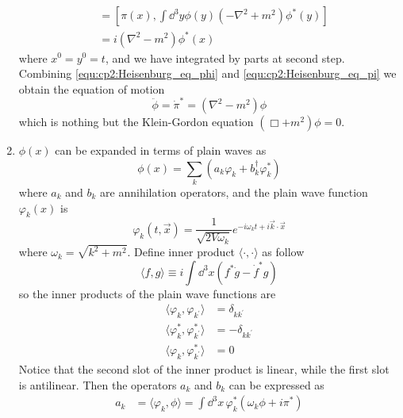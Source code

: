 \begin{enumerate}[label = {(\alph*)}]
\begin{align}
        & = \left[\pi(x), \int \dd^3y \phi(y)(-\nabla^2 + m^2)\phi^\ast(y)\right]\nonumber\\
        & = i(\nabla^2 - m^2) \phi^\ast(x)
    \end{align}
    where $x^0 = y^0 = t$, and we have integrated by parts at second step. Combining \eqref{equ:cp2:Heisenburg_eq_phi} 
    and \eqref{equ:cp2:Heisenburg_eq_pi} we obtain the equation of motion
    \begin{equation}\label{equ:cp2:csf_equation_of_motion}
        \ddot{\phi} = \dot{\pi}^\ast = (\nabla^2 - m^2)\phi
    \end{equation}
    which is nothing but the Klein-Gordon equation $(\Box + m^2)\phi = 0$.

    \item $\phi(x)$ can be expanded in terms of plain waves as
    \begin{equation}\label{equ:cp2:phi_expand}
        \phi(x) = \sum_k \left(a_k \varphi_k + b^\dagger_k \varphi^\ast_k \right)
    \end{equation}
    where $a_k$ and $b_k$ are annihilation operators, and the plain wave function $\varphi_k(x)$ is 
    \begin{equation}\label{equ:cp2:plain_w}
        \varphi_k(t, \vec{x}) = \frac{1}{\sqrt{2V\omega_k}}e^{-i\omega_kt + i\vec{k}\cdot\vec{x}}
    \end{equation}
    where $\omega_k = \sqrt{k^2 + m^2}$. Define inner product $\langle\cdot,\cdot\rangle$ as follow
    \begin{equation}\label{equ:cp2:inner_prod}
        \langle f, g \rangle \equiv i \int \dd^3x (f^\ast\dot{g} - \dot{f}^\ast g)
    \end{equation}
    so the inner products of the plain wave functions are
    \begin{align*}
        \langle \varphi_k, \varphi_{k^\prime} \rangle & = \delta_{kk^\prime}\\
        \langle \varphi^\ast_k, \varphi^\ast_{k^\prime} \rangle & = -\delta_{kk^\prime}\\
        \langle \varphi_k, \varphi^\ast_{k^\prime} \rangle & = 0
    \end{align*}
    Notice that the second slot of the inner product is linear, while the first slot is antilinear. 
    Then the operators $a_k$ and $b_k$ can be expressed as
    \begin{subequations}\label{equ:cp2:csf_optr_a_b}
        \begin{align}
            a_k & = \langle \varphi_k, \phi \rangle = \int \dd^3x \, \varphi^\ast_k \left(\omega_k\phi + i\pi^\ast\right)\\

\end{align}
\end{subequations}
\end{enumerate}
